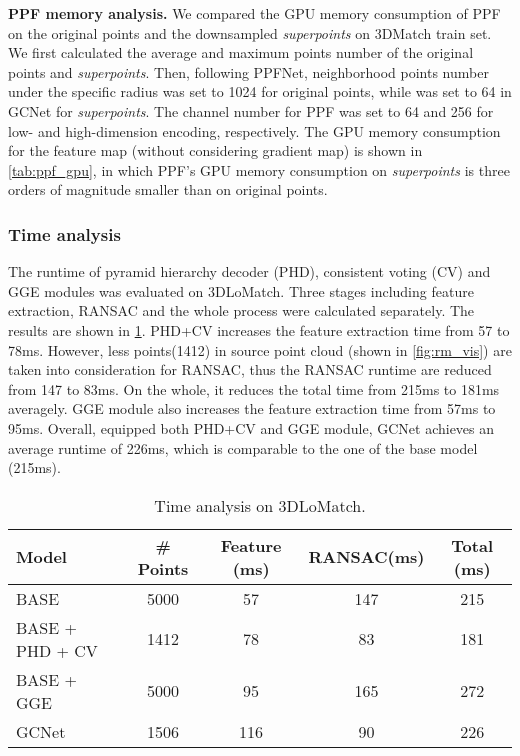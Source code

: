 \documentclass[10pt,twocolumn,letterpaper]{article}
\begin{document}
\textbf{PPF memory analysis.} We compared the GPU memory consumption of PPF on the original points and the downsampled \emph{superpoints} on 3DMatch train set. We first calculated the average and maximum points number of the original points and \emph{superpoints}. Then, following PPFNet\cite{deng2018ppfnet}, neighborhood points number  under the specific radius was set to 1024 for original points, while  was set to 64 in GCNet for \emph{superpoints}. The channel number  for PPF was set to 64 and 256 for low- and high-dimension encoding, respectively. The GPU memory consumption for the feature map (without considering gradient map) is shown in \cref{tab:ppf_gpu}, in which PPF's GPU memory consumption on \emph{superpoints} is three orders of magnitude smaller than on original points.

\subsubsection{Time analysis} 
\vspace{-.25em}
The runtime of pyramid hierarchy decoder (PHD), consistent voting (CV) and GGE modules was evaluated on 3DLoMatch. Three stages including feature extraction, RANSAC and the whole process were calculated separately. The results are shown in \cref{tab:time}. PHD+CV increases the feature extraction time from 57 to 78ms. However, less points(1412) in source point cloud (shown in \cref{fig:rm_vis}) are taken into consideration for RANSAC, thus the RANSAC runtime are reduced from 147 to 83ms. On the whole, it reduces the total time from 215ms to 181ms averagely. GGE module also increases the feature extraction time from 57ms to 95ms. Overall, equipped both PHD+CV and GGE module, GCNet achieves an average runtime of 226ms, which is comparable to the one of the base model (215ms).

\begin{table}[h!]
\setlength{\tabcolsep}{1pt}
\centering\footnotesize
\vspace{-.75em}
\begin{tabular}{l|cccc}
\toprule
Model & \# Points & Feature (ms) & RANSAC(ms) & Total (ms) \\
\midrule
BASE & 5000 & 57 & 147 & 215 \\
BASE + PHD + CV & 1412 & 78 & 83 & 181 \\
BASE + GGE & 5000 & 95 & 165 & 272 \\
GCNet & 1506 & 116 & 90 & 226 \\
\bottomrule
\end{tabular}
\vspace{-.5em}
\caption{Time analysis on 3DLoMatch.}
\vspace{-1.25em}
\label{tab:time}
\end{table}
\end{document}
